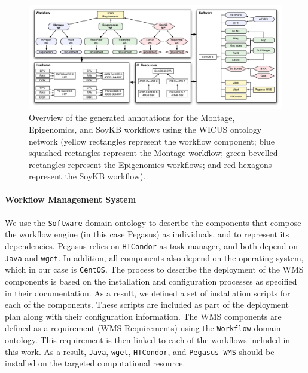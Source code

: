 \begin{figure}[!htb]
	\centering
	\includegraphics[width=\linewidth]{figures/annotations}
	\vspace{-20pt}
	\caption{Overview of the generated annotations for the Montage, Epigenomics, and 
  	  SoyKB workflows using the WICUS ontology network (yellow rectangles represent the 
	  workflow component; blue squashed rectangles represent the Montage workflow; green 
	  bevelled rectangles represent the Epigenomics workflows; and red hexagons represent 
	  the SoyKB workflow). }
	\label{fig:annotations}
\end{figure}


\paragraph{\textbf{Workflow Management System}}
We use the \texttt{Software} domain ontology to describe the components that
compose the workflow engine (in this case Pegasus) as individuals, and to 
represent its dependencies. Pegasus relies on \texttt{HTCondor} as task manager, and 
both depend on \texttt{Java} and \texttt{wget}. In addition, all components also
depend on the operating system, which in our case is \texttt{CentOS}. The process
to describe the deployment of the WMS components is based on the installation 
and configuration processes as specified in their documentation. As a result, we 
defined a set of installation scripts for each of the components. These scripts are 
included as part of the deployment plan along with their configuration information.
The WMS components are defined as a requirement (WMS Requirements) using
the \texttt{Workflow} domain ontology. This requirement is then linked to each
of the workflows included in this work. As a result, \texttt{Java}, \texttt{wget}, 
\texttt{HTCondor}, and \texttt{Pegasus WMS} should be installed on the targeted
computational resource.


